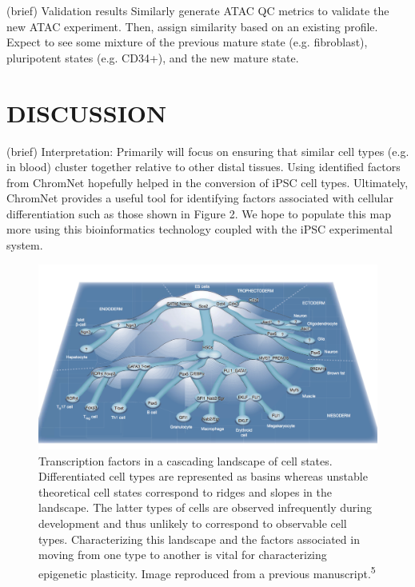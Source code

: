 \documentclass[12pt]{article}
\begin{document}
(brief) Validation results  \newline
Similarly generate ATAC QC metrics to validate the new ATAC experiment. Then, assign similarity based on an existing profile. Expect to see some mixture of the previous mature state (e.g. fibroblast), pluripotent states (e.g. CD34+), and the new mature state. 

 \section{\textbf{{\Large D}{\small ISCUSSION}}}
(brief) Interpretation: Primarily will focus on ensuring that similar cell types (e.g. in blood) cluster together relative to other distal tissues. Using identified factors from ChromNet hopefully helped in the conversion of iPSC cell types. \newline \newline Ultimately, ChromNet provides a useful tool for identifying factors associated with cellular differentiation such as those shown in Figure 2. We hope to populate this map more using this bioinformatics technology coupled with the iPSC experimental system. 

\begin{center}
\begin{figure}[h]
\includegraphics[width=0.85\paperwidth]{tf_landscape.png}
\caption{Transcription factors in a cascading landscape of cell states. Differentiated cell types are represented as basins whereas unstable theoretical cell states correspond to ridges and slopes in the landscape. The latter types of cells are observed infrequently during development and thus unlikely to correspond to observable cell types. Characterizing this landscape and the factors associated in moving from one type to another is vital for characterizing epigenetic plasticity. Image reproduced from a previous manuscript.\textsuperscript{5}}
\end{figure}
\end{center}
\end{document}
